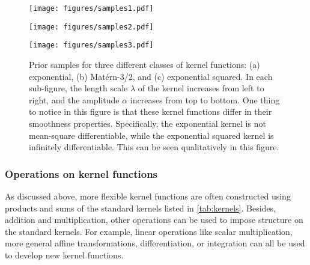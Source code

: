 \documentclass[letterpaper]{ar-1col}
\begin{document}
\begin{figure}[ht]
  \centering
  \begin{minipage}[t]{0.3\linewidth}
    \texttt{[image: figures/samples1.pdf]}
  \end{minipage} \hfill
  \begin{minipage}[t]{0.3\linewidth}
    \texttt{[image: figures/samples2.pdf]}
  \end{minipage} \hfill
  \begin{minipage}[t]{0.3\linewidth}
    \texttt{[image: figures/samples3.pdf]}
  \end{minipage}
  \caption{Prior samples for three different classes of kernel functions: (a) exponential, (b) Mat\'ern-3/2, and (c) exponential squared.
  In each sub-figure, the length scale $\lambda$ of the kernel increases from left to right, and the amplitude $\alpha$ increases from top to bottom.
  One thing to notice in this figure is that these kernel functions differ in their smoothness properties.
  Specifically, the exponential kernel is not mean-square differentiable, while the exponential squared kernel is infinitely differentiable.
  This can be seen qualitatively in this figure.}
  \label{fig:samples}
\end{figure}

\subsubsection{Operations on kernel functions}\label{sec:kernel-ops}

As discussed above, more flexible kernel functions are often constructed using products and sums of the standard kernels listed in \autoref{tab:kernels}.
Besides, addition and multiplication, other operations can be used to impose structure on the standard kernels.
For example, linear operations like scalar multiplication, more general affine transformations, differentiation, or integration can all be used to develop new kernel functions.
\end{document}
